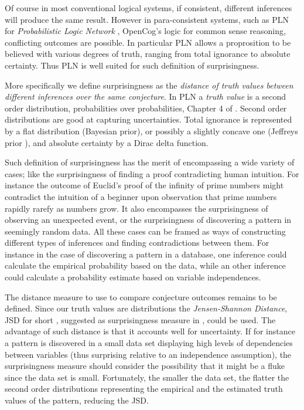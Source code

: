 \documentclass[runningheads]{llncs}
\begin{document}
Of course in
most conventional logical systems, if consistent, different inferences will produce
the same result. However in para-consistent systems, such as PLN for
\emph{Probabilistic Logic Network} \cite{Goertzel2009PLN}, OpenCog's
logic for common sense reasoning, conflicting outcomes are
possible. In particular PLN allows a proprosition to be believed with
various degrees of truth, ranging from total ignorance to absolute
certainty. Thus PLN is well suited for such definition of
surprisingness. 

More specifically we define surprisingness as the
\emph{distance of truth values between different inferences over the
  same conjecture}. In PLN a \emph{truth value} is a second order
distribution, probabilities over probabilities, Chapter 4 of
\cite{Goertzel2009PLN}. Second order distributions are good at
capturing uncertainties. Total ignorance is represented by a flat
distribution (Bayesian prior), or possibly a slightly concave one
(Jeffreys prior \cite{Jeffreys46Invariant}), and absolute certainty by
a Dirac delta function.

Such definition of surprisingness has the merit of encompassing a wide
variety of cases; like the surprisingness of finding a proof
contradicting human intuition. For instance the outcome of Euclid's
proof of the infinity of prime numbers might contradict the intuition
of a beginner upon observation that prime numbers rapidly rarefy as
numbers grow. It also encompasses the surprisingness of observing an
unexpected event, or the surprisingness of discovering a pattern in
seemingly random data. All these cases can be framed as ways of
constructing different types of inferences and finding contradictions
between them. For instance in the case of discovering a pattern in a
database, one inference could calculate the empirical probability
based on the data, while an other inference could calculate a
probability estimate based on variable independences.

The distance measure to use to compare conjecture outcomes remains to
be defined. Since our truth values are distributions the
\emph{Jensen-Shannon Distance}, JSD for short \cite{Endres2003A},
suggested as surprisingness measure in \cite{Pienta2015AN},
could be used. The advantage of such distance is that it accounts well
for uncertainty. If for instance a pattern is discovered in a small
data set displaying high levels of dependencies between variables
(thus surprising relative to an independence assumption), the
surprisingness measure should consider the possibility that it might
be a fluke since the data set is small. Fortunately, the smaller the
data set, the flatter the second order distributions representing the
empirical and the estimated truth values of the pattern, reducing the
JSD.
\end{document}
